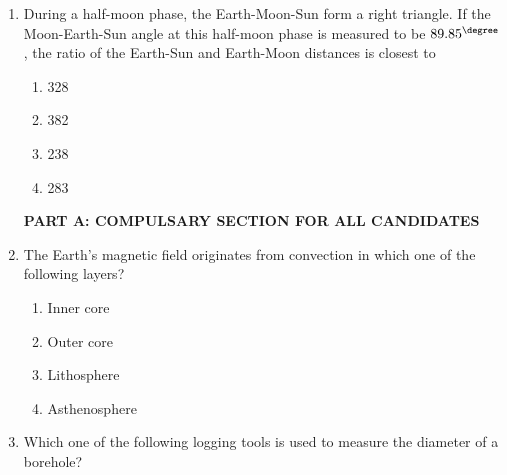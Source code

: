 \documentclass[journal,12pt,onecolumn]{IEEEtran}
\begin{document}
\begin{enumerate}
\hfill{}

\begin{multicols}{4}
\begin{enumerate}
    \item 0
    \item 1
    \item 2
    \item 3
\end{enumerate}
\end{multicols}

\item During a half-moon phase, the Earth-Moon-Sun form a right triangle. If the Moon-Earth-Sun angle at this half-moon phase is measured to be $89.85^{\degree}$, the ratio of the Earth-Sun and Earth-Moon distances is closest to

\hfill{}

\begin{multicols}{4}
\begin{enumerate}
    \item 328
    \item 382
    \item 238
    \item 283
\end{enumerate}
\end{multicols}

\textbf{PART A: COMPULSARY SECTION FOR ALL CANDIDATES}




\item The Earth's magnetic field originates from convection in which one of the following layers?

\hfill{}

\begin{multicols}{2}
\begin{enumerate}
    \item Inner core
    \item Outer core
    \item Lithosphere
    \item Asthenosphere
\end{enumerate}
\end{multicols}

\item Which one of the following logging tools is used to measure the diameter of a borehole?

\hfill{}


\end{enumerate}
\end{document}
